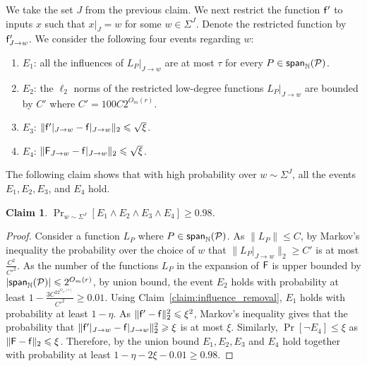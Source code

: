 \documentclass[10pt,a4paper]{amsart}
\newtheorem{claim}[thm]{Claim}
\newcommand\spn{{\sf span}_{\mathbb{N}}}
\renewcommand\geq{\geqslant}
\renewcommand\leq{\leqslant}
\newcommand{\V}[1]{{#1}}
\begin{document}
We take the set $J$ from the previous claim. We next restrict the function $\mathsf{f}'$ to inputs $\V x$ such that $\V x|_{J} = \V w$ for some $\V w\in \Sigma^J$. Denote the restricted function by $\noisyfrefined_{J\rightarrow \V w}$. We consider the following four events regarding $w$:
\begin{enumerate}
    \item $E_1$: all the influences of $L_P|_{J\rightarrow \V w}$ are at most $\tau$ for every $P\in \spn(\mathcal{P})$.
    \item $E_2$: the $\ell_2$ norms of the restricted low-degree functions $L_P|_{J\rightarrow \V w}$ are bounded by $C'$ where $C' = 100C2^{O_m(r)}$.
    \item $E_3$: $\|\noisyfrefined|_{J\rightarrow \V w} - \noisyfcoarse|_{J\rightarrow \V w}\|_2 \leq \sqrt{\xi}$.
    \item $E_4$:  $\|\fcoarsedecomposed_{J\rightarrow \V w}  - \noisyfcoarse|_{J\rightarrow \V w}\|_2 \leq \sqrt{\xi}$.
\end{enumerate}
The following claim shows that with high probability over $\V w\sim \Sigma^J$, all the events $E_1, E_2, E_3$, and $E_4$ hold.
\begin{claim}\label{claim:goodevents}
    $\Pr_{\V w\sim \Sigma^J}\left[E_1 \wedge E_2 \wedge E_3\wedge E_4\right]\geq 0.98$.
\end{claim}
\begin{proof}
    Consider a function $L_P$ where $P\in \spn(\mathcal{P})$. As $\|L_P\|\leq C$, by Markov's inequality the probability over the choice of $w$ that $\|L_P|_{J\rightarrow \V w}\|_2\geq C'$ is at most $\frac{C^2}{C'^2}$. As the number of the functions $L_P$ in the expansion of ${\mathsf{F}}$ is upper bounded by $|\spn(\mathcal{P})|\leq 2^{O_m(r
    )}$, 
    by union bound, the event $E_2$ holds with probability at least $1-\frac{3C^22^{O_m(r)}}{C'^2}\geq 0.01$. Using Claim~\ref{claim:influence_removal}, $E_1$ holds with probability at least $1-
    \eta$.
    As $\|\noisyfrefined-\noisyfcoarse\|_2^2\leq \xi^2$, Markov's inequality gives that the probability that $\|\noisyfrefined|_{J\rightarrow \V w} - \noisyfcoarse|_{J\rightarrow \V w}\|_2^2\geq \xi$ is at most $\xi$. Similarly, $\Pr[\neg E_4]\leq \xi$ as  $\|\fcoarsedecomposed  - \noisyfcoarse\|_2 \leq \xi$. Therefore, by the union bound $E_1, E_2, E_3$ and $E_4$ hold together with probability at least $1-\eta-2\xi -0.01\geq 0.98$. 
    \end{proof}
\end{document}

